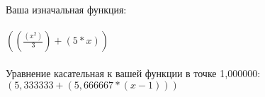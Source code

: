 \documentclass[12pt,a4paper]{scrartcl}
\begin{document}
\\\\Ваша изначальная функция: \\
\\{${({(\frac{({x}^{2})}{3})}+{({5}*{x})})}$}
\\\\Уравнение касательная к вашей функции в точке 1,000000:
\\{${({5,333333}+{({5,666667}*{({x}-{1})})})}$}
\end{document}
